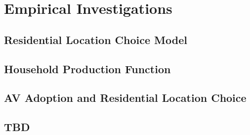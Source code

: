 \section{Empirical Investigations}
\subsection{Residential Location Choice Model}

\subsection{Household Production Function}

\subsection{AV Adoption and Residential Location Choice}

\subsection{TBD}


